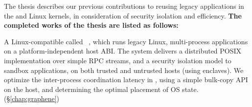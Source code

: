 \label{chap:proposal}

The thesis describes our previous contributions
to reusing legacy applications in the \graphene{} \libos{} and Linux kernels,
in consideration of security isolation and efficiency.
{\bf The completed works of the thesis are listed as follows:}

\vspace{\baselineskip}
\begin{compactitem}

\item A Linux-compatible \libos{} called \term{\graphene{}}~\citep{tsai14graphene},
which runs legacy Linux, multi-process applications on a platform-independent host ABI.
The system delivers a distributed POSIX implementation
over simple RPC streams,
and a security isolation model to sandbox applications,
on both trusted and untrusted hosts (using \sgx{} enclaves).
We optimize
the inter-process coordination latency in \graphene{},
using a simple bulk-copy API on the host, and determining the optimal placement of OS state.
(\S\ref{chap:graphene})


\end{compactitem}
